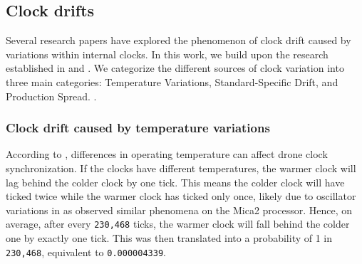 


\subsection{Clock drifts}
\label{drifting}
Several research papers have explored the phenomenon of clock drift caused by variations within internal clocks. In this work, we build upon the research established in \cite{WEBSTER2020101183} and \cite{Elsts2018}.  We categorize the different sources of clock variation into three main categories: Temperature Variations, Standard-Specific Drift, and Production Spread.  \cite{Zaid2012}.


\subsubsection{Clock drift caused by temperature variations}
\label{clockdriftliterature}
According to \citeauthor{WEBSTER2020101183} \cite{WEBSTER2020101183} \cite{WebsterBDFM18}, differences in operating temperature can affect drone clock synchronization. If the clocks have different temperatures, the warmer clock will lag behind the colder clock by one tick. This means the colder clock will have ticked twice while the warmer clock has ticked only once, likely due to oscillator variations in \cite{Lenzen2009} as \citeauthor{Lenzen2009}  observed similar phenomena on the Mica2 processor. Hence, on average, after every \texttt{230,468} ticks, the warmer clock will fall behind the colder one by exactly one tick. This was then translated into a probability of 1 in \texttt{230,468}, equivalent to \texttt{0.000004339}.

